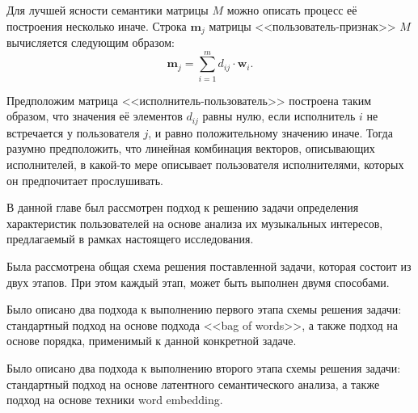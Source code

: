 Для лучшей ясности семантики матрицы $M$ можно описать
процесс её построения несколько иначе. Строка $\bm{m}_j$ матрицы 
<<пользователь-признак>> $M$ вычисляется следующим образом:
\[
    \bm{m}_j = \sum_{i=1}^{m} d_{ij} \cdot \bm{w}_i.
\]

Предположим матрица <<исполнитель-пользователь>> построена 
таким образом, что значения её элементов $d_{ij}$ равны нулю,
если исполнитель $i$ не встречается у пользователя $j$, и равно
положительному значению иначе. Тогда разумно предположить, что
линейная комбинация векторов, описывающих исполнителей, 
в какой-то мере описывает пользователя исполнителями, которых
он предпочитает прослушивать.

\chapterconclusion

В данной главе был рассмотрен подход к решению задачи
определения характеристик пользователей на основе анализа
их музыкальных интересов, предлагаемый в рамках настоящего
исследования. 

Была рассмотрена общая схема решения поставленной задачи,
которая состоит из двух этапов. При этом каждый этап, может
быть выполнен двумя способами.

Было описано два подхода к выполнению первого этапа схемы
решения задачи: стандартный подход на основе подхода
<<bag of words>>, а также подход на основе порядка, применимый
к данной конкретной задаче.

Было описано два подхода к выполнению второго этапа схемы
решения задачи: стандартный подход на основе латентного
семантического анализа, а также подход на основе техники
word embedding.

